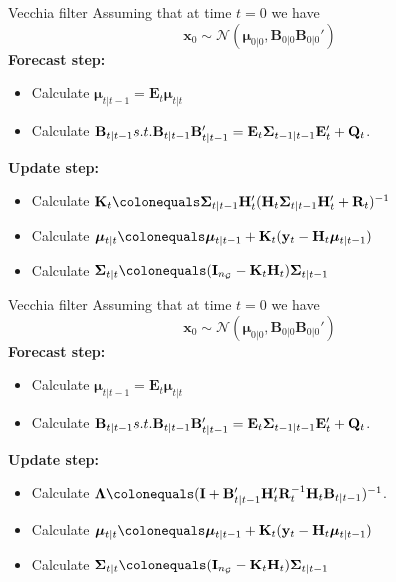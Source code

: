 \documentclass{beamer}
\newcommand{\bx}{\mathbf{x}}
\newcommand{\by}{\mathbf{y}}
\newcommand{\bE}{\mathbf{E}}
\newcommand{\bI}{\mathbf{I}}
\newcommand{\bH}{\mathbf{H}}
\newcommand{\bK}{\mathbf{K}}
\newcommand{\bQ}{\mathbf{Q}}
\newcommand{\bB}{\mathbf{B}}
\newcommand{\bR}{\mathbf{R}}
\newcommand{\bfmu}{\bm{\mu}}
\newcommand{\bfSigma}{\bm{\Sigma}}
\newcommand{\bfLambda}{\bm{\Lambda}}
\newcommand{\normal}{\mathcal{N}}
\newcommand{\grid}{\mathcal{G}}
\begin{document}
\begin{frame}{Vecchia filter}
Assuming that at time $t=0$ we have 
$$\bx_0 \sim \normal(\bfmu_{0|0}, \bB_{0|0}\bB_{0|0}')$$
\textbf{Forecast step:}
\begin{itemize}
    \item Calculate $\bfmu_{t|t-1} = \bE_t \bfmu_{t|t}$
    \item Calculate \color{red}$\bB_{t|t-1} s.t. \newline \bB_{t|t-1} \bB'_{t|t-1} = \bE_t \bfSigma_{t-1|t-1} \bE_t' + \bQ_t$.
\end{itemize}
\textbf{Update step:}
\begin{itemize}
    \item Calculate $\bK_t \colonequals \bfSigma_{t|t-1}\bH_t'(\bH_t\bfSigma_{t|t-1} \bH_t'+\bR_t)^{-1}$
    \item Calculate $\bfmu_{t|t} \colonequals \bfmu_{t|t-1} + \bK_t(\by_t - \bH_t \bfmu_{t|t-1})$
    \item Calculate $\bfSigma_{t|t} \colonequals (\bI_{n_\grid} - \bK_t \bH_t) \bfSigma_{t|t-1}$
\end{itemize}
\end{frame}


\begin{frame}{Vecchia filter}
Assuming that at time $t=0$ we have 
$$\bx_0 \sim \normal(\bfmu_{0|0}, \bB_{0|0}\bB_{0|0}')$$
\textbf{Forecast step:}
\begin{itemize}
    \item Calculate $\bfmu_{t|t-1} = \bE_t \bfmu_{t|t}$
    \item Calculate $\bB_{t|t-1} s.t. \newline \bB_{t|t-1} \bB'_{t|t-1} = \bE_t \bfSigma_{t-1|t-1} \bE_t' + \bQ_t$.
\end{itemize}
\textbf{Update step:}
\begin{itemize}
    \item Calculate \color{red}$\bfLambda \colonequals (\bI + \bB_{t|t-1}'\bH_t'\bR_t^{-1}\bH_t\bB_{t|t-1})^{-1}$\color{black}.
    \item Calculate $\bfmu_{t|t} \colonequals \bfmu_{t|t-1} + \bK_t(\by_t - \bH_t \bfmu_{t|t-1})$
    \item Calculate $\bfSigma_{t|t} \colonequals (\bI_{n_\grid} - \bK_t \bH_t) \bfSigma_{t|t-1}$
\end{itemize}
\end{frame}
\end{document}
